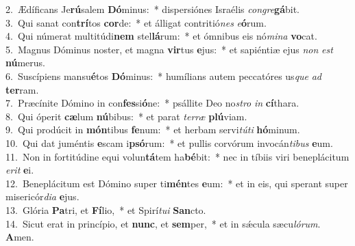 {2.~}Ædíficans Je\textbf{rú}salem \textbf{Dó}minus:~* dispersiónes Israélis \textit{con}\textit{gre}\textbf{gá}bit.\\
{3.~}Qui sanat con\textbf{trí}tos \textbf{cor}de:~* et álligat contritió\textit{nes} \textit{e}\textbf{ó}rum.\\
{4.~}Qui númerat multitúdi\textbf{nem} stel\textbf{lá}rum:~* et ómnibus eis nó\textit{mi}\textit{na} \textbf{vo}cat.\\
{5.~}Magnus Dóminus noster, et magna \textbf{vir}tus \textbf{e}jus:~* et sapiéntiæ ejus \textit{non} \textit{est} \textbf{nú}merus.\\
{6.~}Suscípiens mansu\textbf{é}tos \textbf{Dó}minus:~* humílians autem peccatóres us\textit{que} \textit{ad} \textbf{ter}ram.\\
{7.~}Præcínite Dómino in con\textbf{fes}si\textbf{ó}ne:~* psállite Deo no\textit{stro} \textit{in} \textbf{cí}thara.\\
{8.~}Qui óperit \textbf{cæ}lum \textbf{nú}bibus:~* et parat \textit{ter}\textit{ræ} \textbf{plú}viam.\\
{9.~}Qui prodúcit in \textbf{món}tibus \textbf{fe}num:~* et herbam servi\textit{tú}\textit{ti} \textbf{hó}minum.\\
{10.~}Qui dat juméntis \textbf{e}scam i\textbf{psó}rum:~* et pullis corvórum invocán\textit{ti}\textit{bus} \textbf{e}um.\\
{11.~}Non in fortitúdine equi volun\textbf{tá}tem ha\textbf{bé}bit:~* nec in tíbiis viri beneplácitum \textit{e}\textit{rit} \textbf{e}i.\\
{12.~}Beneplácitum est Dómino super ti\textbf{mén}tes \textbf{e}um:~* et in eis, qui sperant super misericór\textit{di}\textit{a} \textbf{e}jus.\\
{13.~}Glória \textbf{Pa}tri, et \textbf{Fí}lio,~* et Spirí\textit{tu}\textit{i} \textbf{San}cto.\\
{14.~}Sicut erat in princípio, et \textbf{nunc}, et \textbf{sem}per,~* et in sǽcula sæcu\textit{ló}\textit{rum}. \textbf{A}men.\\
